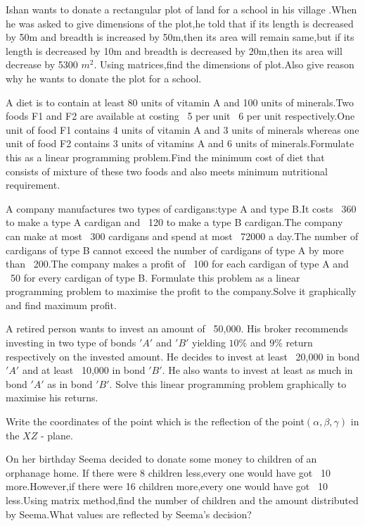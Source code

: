 \item Ishan wants to donate a rectangular plot of land for a school in his village .When he was asked to give dimensions of the plot,he told that if its length is decreased by 50m and breadth is increased by 50m,then its area will remain same,but if its length is decreased by 10m and breadth is decreased by 20m,then its area will decrease by 5300 $m^{2}$. Using matrices,find the dimensions of plot.Also give reason why he wants to donate the plot for a school.
\item A diet is to contain at least 80 units of vitamin A and 100 units of minerals.Two foods F1 and F2 are available at costing \rupee~5 per unit \rupee~6 per unit respectively.One unit of food F1 contains 4 units of vitamin A and 3 units of minerals whereas one unit of food F2 contains  3 units of vitamins A and 6 units of minerals.Formulate this as a linear programming problem.Find the minimum cost of diet that consists of mixture of these two foods and also meets minimum nutritional requirement.
\item A company manufactures two types of cardigans:type A and type B.It costs \rupee~360 to make a type A cardigan and \rupee~120 to make a type B cardigan.The company can make at most \rupee~300 cardigans and spend at most \rupee~72000 a day.The number of cardigans of type B cannot exceed the number of cardigans of type A by more than \rupee~200.The company makes a profit of \rupee~100 for each cardigan of type A and \rupee~50 for every cardigan of type B. Formulate this problem as a linear programming problem to maximise the profit to the company.Solve it graphically and find maximum profit.
\item A retired person wants to invest an amount  of \rupee~50,000. His broker recommends investing in two type of bonds $'A'$ and $'B'$ yielding $10\%$ and $9\%$ return respectively on the invested amount. He decides to invest at least \rupee~20,000 in bond $'A'$ and at least \rupee~10,000 in bond $'B'$. He also wants to invest at least as much in bond $'A'$ as in bond $'B'$. Solve this linear programming problem graphically to maximise his returns.
\item Write the coordinates of the point which is the reflection of the point$({\alpha},{\beta},{\gamma}) $ in the $ XZ$ - plane.
																				      								        																																					\item On her birthday Seema decided to donate some money to children of an orphanage home. If there were 8 children less,every one would have got \rupee~10 more.However,if there were 16 children more,every one would have got \rupee~10 less.Using matrix method,find the number of children and the amount distributed by Seema.What values are reflected by Seema's decision?

